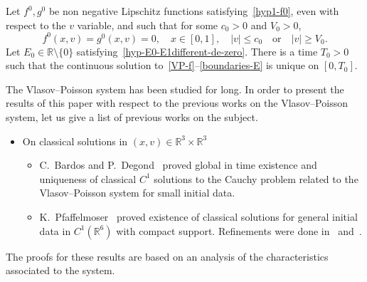 \documentclass[AHL,Unicode,longabstracts,published]{cedram}
\newcommand{\R}{\mathbb{R}}
\begin{document}
\begin{theo}\label{main-result-unicite}
Let $f^0, g^0$ be non negative Lipschitz functions satisfying~\eqref{hyp1-f0}, even with respect to the $v$ variable, and such that for some $c_0>0$ and $V_0>0$,
\[
f^0(x,v)= g^0(x,v)= 0,\quad x\in [0,1],\quad |v| \leq c_0 \quad \text{or}\quad |v| \geq V_0.
\]
Let $E_0\in \R \setminus \{ 0\} $ satisfying~\eqref{hyp-E0-E1different-de-zero}. 
There is a time $T_0>0$ such that the continuous solution to~\eqref{VP-f}--\eqref{boundaries-E} is unique on $[0, T_0] $.
\end{theo}

The Vlasov--Poisson system has been studied for long. In order to present the results of this paper with respect to the previous works on the Vlasov--Poisson system, let us give a list of previous works on the subject. 
\begin{itemize}
\item On classical solutions in $(x,v)\in \R ^3\times \R ^3$
\begin{itemize}
\item[-] C.~Bardos and P.~Degond~\cite{BD85} proved global in time existence and uniqueness of classical $C^1$ solutions to the Cauchy problem related to the Vlasov--Poisson system for small initial data.
\item[-] K.~Pfaffelmoser~\cite{Pfa92} proved existence of classical solutions for general initial data in $C^1(\R ^6)$ with compact support. Refinements were done in~\cite{Sch91} and~\cite{Rei97}.
\end{itemize}
\end{itemize}
The proofs for these results are based on an analysis of the characteristics associated to the system.
\vspace{4pt}
\end{document}
